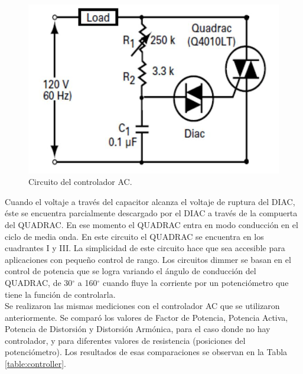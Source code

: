 \documentclass[journal]{IEEEtran}
\begin{document}
\begin{figure}[h]
\centering
\includegraphics[clip,width=\columnwidth]{controller.png}
\caption{Circuito del controlador AC.}
\label{ACcontroller}
\end{figure}

Cuando el voltaje a través del capacitor alcanza el 
voltaje de ruptura del DIAC, éste se encuentra 
parcialmente descargado por el DIAC a través de la 
compuerta del QUADRAC. En ese momento el QUADRAC 
entra en modo conducción en el ciclo de media onda. 
En este circuito el QUADRAC se encuentra en los 
cuadrantes I y III. La simplicidad de este circuito 
hace que sea accesible para aplicaciones con pequeño 
control de rango. Los circuitos dimmer se basan en el 
control de potencia que se logra variando el ángulo de 
conducción del QUADRAC, de 30$^{\circ}$ a 160$^{\circ}$ 
cuando fluye la 
corriente por un potenciómetro que tiene la función de 
controlarla. \\

Se realizaron las mismas mediciones con el controlador AC 
que se utilizaron anteriormente. Se comparó los valores de
Factor de Potencia, Potencia Activa, Potencia de Distorsión
y Distorsión Armónica, para el caso donde no hay controlador, 
y para diferentes valores de resistencia (posiciones del 
potenciómetro). Los resultados 
de esas comparaciones se observan en la Tabla 
\ref{table:controller}. \\
\end{document}

